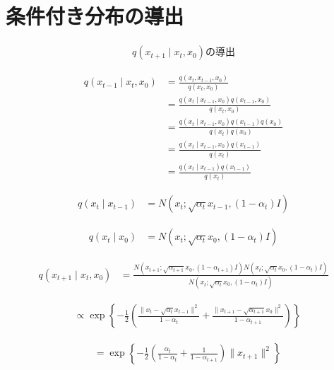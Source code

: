 \documentclass{article}
\begin{document}
\section{条件付き分布の導出}

\begin{align*}
q \left( x_{t+1} \mid x_t, x_0 \right) \text{の導出}
\end{align*}

\begin{align*}
q \left( x_{t-1} \mid x_t, x_0 \right) &= \frac{q \left( x_t, x_{t-1}, x_0 \right)}{q \left( x_t, x_0 \right)} \\
&= \frac{q \left( x_t \mid x_{t-1}, x_0 \right) q \left( x_{t-1}, x_0 \right)}{q \left( x_t, x_0 \right)} \\
&= \frac{q \left( x_t \mid x_{t-1}, x_0 \right) q \left( x_{t-1} \right) q \left( x_0 \right)}{q \left( x_t \right) q \left( x_0 \right)} \\
&= \frac{q \left( x_t \mid x_{t-1}, x_0 \right) q \left( x_{t-1} \right)}{q \left( x_t \right)} \\
&= \frac{q \left( x_t \mid x_{t-1} \right) q \left( x_{t-1} \right)}{q \left( x_t \right)}
\end{align*}

\begin{align*}
q \left( x_t \mid x_{t-1} \right) &= N \left( x_t ; \sqrt{\alpha_t} x_{t-1}, (1-\alpha_t) I \right)
\end{align*}

\begin{align*}
q \left( x_t \mid x_0 \right) &= N \left( x_t ; \sqrt{\alpha_t} x_0, (1-\alpha_t) I \right)
\end{align*}

\begin{align*}
q \left( x_{t+1} \mid x_t, x_0 \right) &= \frac{N \left( x_{t+1} ; \sqrt{\alpha_{t+1}} x_0, (1-\alpha_{t+1}) I \right) N \left( x_t ; \sqrt{\alpha_t} x_0, (1-\alpha_t) I \right)}{N \left( x_t ; \sqrt{\alpha_t} x_0, (1-\alpha_t) I \right)}
\end{align*}

\begin{align*}
&\propto \exp \left\{ -\frac{1}{2} \left( \frac{\| x_t - \sqrt{\alpha_t} x_{t-1} \|^2}{1-\alpha_t} + \frac{\| x_{t+1} - \sqrt{\alpha_{t+1}} x_0 \|^2}{1-\alpha_{t+1}} \right) \right\}
\end{align*}

\begin{align*}
&= \exp \left\{ -\frac{1}{2} \left( \frac{\alpha_t}{1-\alpha_t} + \frac{1}{1-\alpha_{t+1}} \right) \| x_{t+1} \|^2 \right\}
\end{align*}
\end{document}
